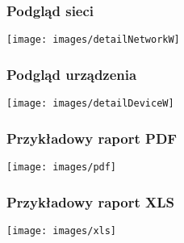 \documentclass[ucs]{beamer}
\begin{document}
\begin{frame}
\frametitle{Podgląd sieci}
\texttt{[image: images/detailNetworkW]}
\end{frame}

\begin{frame}
\frametitle{Podgląd urządzenia}
\texttt{[image: images/detailDeviceW]}
\end{frame}

\begin{frame}
\frametitle{Przykładowy raport PDF}
\begin{center}
\texttt{[image: images/pdf]}
\end{center}
\end{frame}

\begin{frame}
\frametitle{Przykładowy raport XLS}
\begin{center}
\texttt{[image: images/xls]}
\end{center}
\end{frame}
\end{document}
